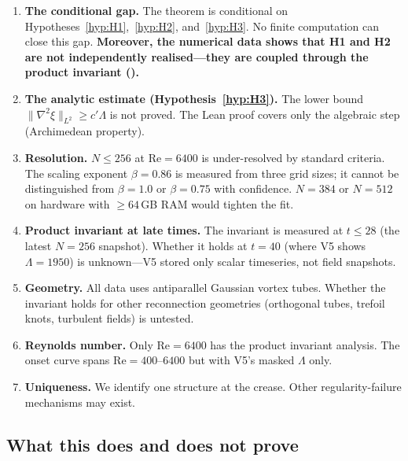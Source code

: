 \documentclass[11pt,a4paper]{article}
\theoremstyle{definition}
\newcommand{\lapl}{\nabla^2}
\newcommand{\norm}[1]{\lVert #1 \rVert}
\newcommand{\Rey}{\mathrm{Re}}
\newcommand{\strongclaim}[1]{\textbf{#1}}  %
\begin{document}
\begin{enumerate}
  \item \textbf{The conditional gap.}  The theorem is conditional on
    Hypotheses~\ref{hyp:H1},~\ref{hyp:H2}, and~\ref{hyp:H3}.
    No finite computation can close this gap.
    \strongclaim{Moreover, the numerical data shows that H1 and H2
    are not independently realised---they are coupled through the
    product invariant (\Cref{rmk:coupling}).}

  \item \textbf{The analytic estimate (Hypothesis~\ref{hyp:H3}).}
    The lower bound
    $\norm{\lapl\xi}_{L^2}\geq c'\Lambda$ is not proved.  The Lean
    proof covers only the algebraic step (Archimedean property).

  \item \textbf{Resolution.}  $N\leq256$ at
    $\Rey=6400$ is under-resolved by standard criteria.  The scaling
    exponent $\beta=0.86$ is measured from three grid sizes; it
    cannot be distinguished from $\beta=1.0$ or $\beta=0.75$ with
    confidence.  $N=384$ or $N=512$ on hardware with ${\geq}64$\,GB
    RAM would tighten the fit.

  \item \textbf{Product invariant at late times.}  The invariant is
    measured at $t\leq28$ (the latest $N{=}256$ snapshot).
    Whether it holds at $t=40$ (where V5 shows $\Lambda=1950$) is
    unknown---V5 stored only scalar timeseries, not field snapshots.

  \item \textbf{Geometry.}  All data uses antiparallel Gaussian
    vortex tubes.  Whether the invariant holds for other reconnection
    geometries (orthogonal tubes, trefoil knots, turbulent fields)
    is untested.

  \item \textbf{Reynolds number.}  Only $\Rey=6400$ has the product
    invariant analysis.  The onset curve spans $\Rey=400$--$6400$ but
    with V5's masked $\Lambda$ only.

  \item \textbf{Uniqueness.}  We identify one structure at the
    crease.  Other regularity-failure mechanisms may exist.
\end{enumerate}

\subsection{What this does and does not prove}
\end{document}
